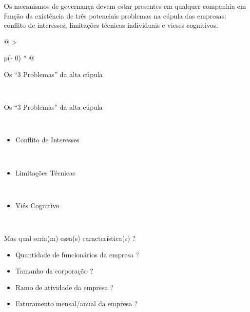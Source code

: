\documentclass[
]{book}
\providecommand{\tightlist}{%
  \setlength{\itemsep}{0pt}\setlength{\parskip}{0pt}}
\begin{document}
Os mecanismos de governança devem estar presentes em qualquer companhia em função da existência de três potenciais problemas na cúpula das empresas: conflito de interesses, limitações técnicas individuais e vieses cognitivos.

\begin{longtable}[]{@{}
  >{\raggedright\arraybackslash}p{(\columnwidth - 0\tabcolsep) * }@{}}
\caption{Mas nem todas as empresas vão apresentar necessidade imediata de implantação de uma estrutura de Governança Corporativa. Existem cenários uma característica torna a necessidade da implantação imediata.}\tabularnewline
\toprule\noalign{}
\begin{minipage}[b]{\linewidth}\raggedright
Os ``3 Problemas'' da alta cúpula
\end{minipage} \\
\midrule\noalign{}
\endfirsthead
\toprule\noalign{}
\begin{minipage}[b]{\linewidth}\raggedright
Os ``3 Problemas'' da alta cúpula
\end{minipage} \\
\midrule\noalign{}
\endhead
\bottomrule\noalign{}
\endlastfoot
\begin{minipage}[t]{\linewidth}\raggedright
\begin{itemize}
\tightlist
\item
  Conflito de Interesses
\end{itemize}
\end{minipage} \\
\begin{minipage}[t]{\linewidth}\raggedright
\begin{itemize}
\tightlist
\item
  Limitações Técnicas
\end{itemize}
\end{minipage} \\
\begin{minipage}[t]{\linewidth}\raggedright
\begin{itemize}
\tightlist
\item
  Viés Cognitivo
\end{itemize}
\end{minipage} \\
\end{longtable}

Mas qual seria(m) essa(s) característica(s) ?

\begin{itemize}
\tightlist
\item
  Quantidade de funcionários da empresa ?
\item
  Tamanho da corporação ?
\item
  Ramo de atividade da empresa ?
\item
  Faturamento mensal/anual da empresa ?
\end{itemize}
\end{document}

